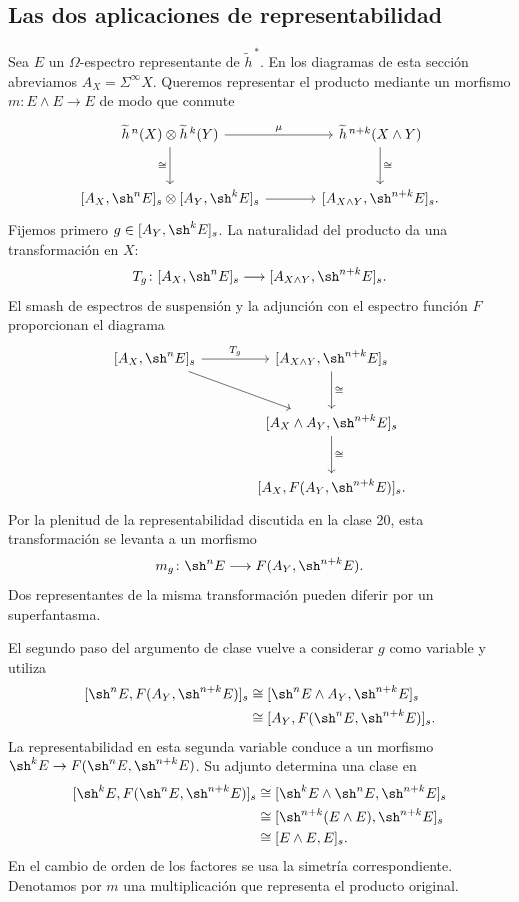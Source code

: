 \subsection{Las dos aplicaciones de representabilidad}
Sea $E$ un $\Omega$-espectro representante de $\widetilde h^{\,*}$. En los diagramas de esta sección abreviamos $A_X=\Sigma^\infty X$. Queremos representar el producto mediante un morfismo $m\colon E\wedge E\to E$ de modo que conmute
\[
\begin{tikzcd}[column sep=large,row sep=large]
\widetilde h^{\,n}(X)\otimes\widetilde h^{\,k}(Y)\arrow[r,"\mu"]\arrow[d,"\cong"']&
\widetilde h^{\,n+k}(X\wedge Y)\arrow[d,"\cong"]\\
{[A_X,\sh^nE]_s}\otimes{[A_Y,\sh^kE]_s}\arrow[r]&{[A_{X\wedge Y},\sh^{n+k}E]_s}.
\end{tikzcd}
\]
Fijemos primero $g\in[A_Y,\sh^kE]_s$. La naturalidad del producto da una transformación en $X$:
\[
T_g\colon[A_X,\sh^nE]_s\longrightarrow[A_{X\wedge Y},\sh^{n+k}E]_s.
\]
El smash de espectros de suspensión y la adjunción con el espectro función $F$ proporcionan el diagrama
\[
\begin{tikzcd}[column sep=large,row sep=large]
{[A_X,\sh^nE]_s}\arrow[r,"T_g"]\arrow[dr]&
{[A_{X\wedge Y},\sh^{n+k}E]_s}\arrow[d,"\cong"]\\
&{[A_X\wedge A_Y,\sh^{n+k}E]_s}\arrow[d,"\cong"]\\
&{[A_X,F(A_Y,\sh^{n+k}E)]_s}.
\end{tikzcd}
\]
Por la plenitud de la representabilidad discutida en la clase 20, esta transformación se levanta a un morfismo
\[
m_g\colon \sh^nE\longrightarrow F(A_Y,\sh^{n+k}E).
\]
Dos representantes de la misma transformación pueden diferir por un superfantasma.

El segundo paso del argumento de clase vuelve a considerar $g$ como variable y utiliza
\[
\begin{aligned}
[\sh^nE,F(A_Y,\sh^{n+k}E)]_s
&\cong[\sh^nE\wedge A_Y,\sh^{n+k}E]_s\\
&\cong[A_Y,F(\sh^nE,\sh^{n+k}E)]_s.
\end{aligned}
\]
La representabilidad en esta segunda variable conduce a un morfismo $\sh^kE\to F(\sh^nE,\sh^{n+k}E)$. Su adjunto determina una clase en
\[
\begin{aligned}
[\sh^kE,F(\sh^nE,\sh^{n+k}E)]_s
&\cong[\sh^kE\wedge \sh^nE,\sh^{n+k}E]_s\\
&\cong[\sh^{n+k}(E\wedge E),\sh^{n+k}E]_s\\
&\cong[E\wedge E,E]_s.
\end{aligned}
\]
En el cambio de orden de los factores se usa la simetría correspondiente. Denotamos por $m$ una multiplicación que representa el producto original.

